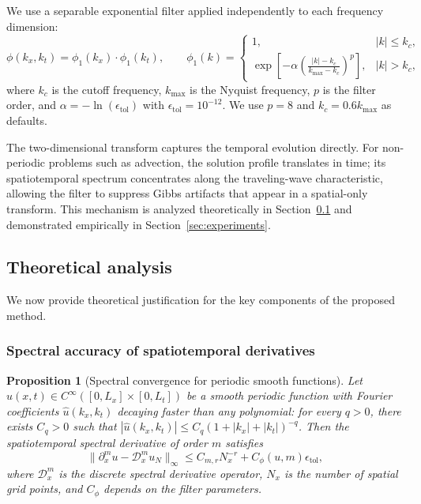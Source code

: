 \documentclass[preprint,12pt]{elsarticle}
\newtheorem{proposition}{Proposition}
\begin{document}
We use a separable exponential filter applied independently to each frequency dimension:
\begin{equation}
\phi(k_x, k_t) = \phi_1(k_x) \cdot \phi_1(k_t), \qquad
\phi_1(k) = \begin{cases}
1, & |k| \le k_c, \\
\exp\!\left[-\alpha \left(\frac{|k|-k_c}{k_{\max}-k_c}\right)^p\right], & |k| > k_c,
\end{cases}
\end{equation}
where $k_c$ is the cutoff frequency, $k_{\max}$ is the Nyquist frequency, $p$ is the filter order, and $\alpha = -\ln(\epsilon_{\text{tol}})$ with $\epsilon_{\text{tol}} = 10^{-12}$. We use $p = 8$ and $k_c = 0.6 k_{\max}$ as defaults.

The two-dimensional transform captures the temporal evolution directly. For non-periodic problems such as advection, the solution profile translates in time; its spatiotemporal spectrum concentrates along the traveling-wave characteristic, allowing the filter to suppress Gibbs artifacts that appear in a spatial-only transform. This mechanism is analyzed theoretically in Section~\ref{sec:theory} and demonstrated empirically in Section~\ref{sec:experiments}.

\subsection{Theoretical analysis}
\label{sec:theory}

We now provide theoretical justification for the key components of the proposed method.

\subsubsection{Spectral accuracy of spatiotemporal derivatives}

\begin{proposition}[Spectral convergence for periodic smooth functions]
\label{prop:spectral}
Let $u(x,t) \in C^\infty([0,L_x]\times[0,L_t])$ be a smooth periodic function with Fourier coefficients $\hat{u}(k_x,k_t)$ decaying faster than any polynomial: for every $q>0$, there exists $C_q>0$ such that $|\hat{u}(k_x,k_t)| \le C_q (1+|k_x|+|k_t|)^{-q}$. Then the spatiotemporal spectral derivative of order $m$ satisfies
\begin{equation}
\|\partial_x^m u - \mathcal{D}_x^m u_N\|_\infty \le C_{m,r} N_x^{-r} + C_\phi(u,m) \epsilon_{\mathrm{tol}},
\end{equation}
where $\mathcal{D}_x^m$ is the discrete spectral derivative operator, $N_x$ is the number of spatial grid points, and $C_\phi$ depends on the filter parameters.
\end{proposition}
\end{document}
